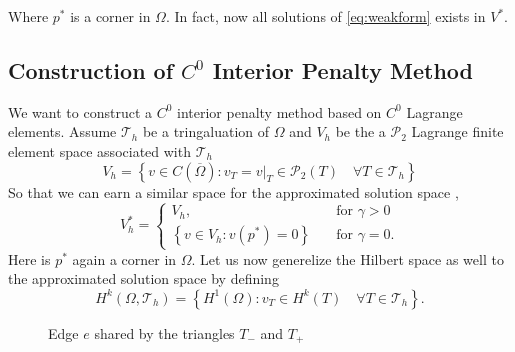 Where $p^{*}$  is a corner in $\Omega $. In fact, now all solutions of \eqref{eq:weakform} exists in $V^{*}$.


\subsection{Construction of $C^{0}$ Interior Penalty Method}%
\label{sub:construction_interior_penalty_method}

We want to construct a $C^{0}$ interior penalty method based on $C^{0}$ Lagrange elements.
Assume $\mathcal{T}_{h} $ be a tringaluation of $\Omega $ and $V_{h}$ be the a $\mathcal{P}_{2} $ Lagrange finite
element space associated with $\mathcal{T}_{h} $ \[
V_{h} = \left\{ v \in C\left( \overline{\Omega } \right) : v_{T} = v |_{T} \in \mathcal{P}_{2}\left( T \right) \quad
\forall T \in  \mathcal{T} _{h}  \right\}
\]
So that we can earn a similar space for the approximated solution space ,
\[
V_{h}^{*} = \begin{cases}
    V_{h}, \quad & \text{for } \gamma >0\\
    \left\{ v \in V_{h}: v\left( p^{*} \right) = 0 \right\} \quad & \text{for } \gamma = 0.
\end{cases}
\]
Here is $p^{*}$ again a corner in $\Omega $. Let us now generelize the Hilbert space as well to the approximated
solution space by defining \[
H^{k}\left( \Omega , \mathcal{T} _{h}  \right) = \left\{ H^{1}\left( \Omega  \right): v_{T} \in H^{k}\left( T
\right)\quad \forall T \in \mathcal{T} _{h} \right\}.
\]
\begin{figure}[!h]
\centering
{}
\caption{Edge $e$ shared by the triangles $T_{-}$ and $T_{+}$   }
\end{figure}
